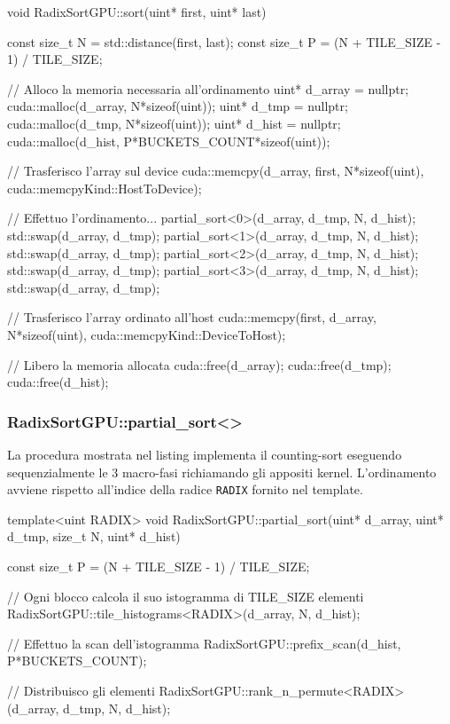 \begin{cpp}[caption={%
		Estratto del codice della procedura principale ordinamento.
	},%
	label={sort-code}, captionpos=t]
void RadixSortGPU::sort(uint* first, uint* last){
	const size_t N = std::distance(first, last);
	const size_t P = (N + TILE_SIZE - 1) / TILE_SIZE;
	
	// Alloco la memoria necessaria all'ordinamento
	uint* d_array = nullptr;
	cuda::malloc(d_array, N*sizeof(uint));
	uint* d_tmp = nullptr;
	cuda::malloc(d_tmp, N*sizeof(uint));
	uint* d_hist = nullptr;
	cuda::malloc(d_hist, P*BUCKETS_COUNT*sizeof(uint));
	
	// Trasferisco l'array sul device
	cuda::memcpy(d_array, first, N*sizeof(uint), 
	             cuda::memcpyKind::HostToDevice);
	
	// Effettuo l'ordinamento...
	partial_sort<0>(d_array, d_tmp, N, d_hist); 
	std::swap(d_array, d_tmp);
	partial_sort<1>(d_array, d_tmp, N, d_hist); 
	std::swap(d_array, d_tmp);
	partial_sort<2>(d_array, d_tmp, N, d_hist); 
	std::swap(d_array, d_tmp);
	partial_sort<3>(d_array, d_tmp, N, d_hist); 
	std::swap(d_array, d_tmp);

	// Trasferisco l'array ordinato all'host
	cuda::memcpy(first, d_array, N*sizeof(uint), 
	             cuda::memcpyKind::DeviceToHost);
	
	// Libero la memoria allocata
	cuda::free(d_array);
	cuda::free(d_tmp);
	cuda::free(d_hist);
}
\end{cpp}

\subsubsection{RadixSortGPU::partial\_sort<>}
La procedura  mostrata nel listing  implementa il counting-sort eseguendo sequenzialmente le 3 macro-fasi richiamando gli appositi kernel. L'ordinamento avviene rispetto all'indice della radice \texttt{RADIX} fornito nel template.

\begin{cpp}[caption={%
		Estratto del codice della procedura partial di ordinamento.
	},%
	label={partial-code}, captionpos=t]
template<uint RADIX>
void RadixSortGPU::partial_sort(uint* d_array, uint* d_tmp, 
                                size_t N, uint* d_hist){
	const size_t P = (N + TILE_SIZE - 1) / TILE_SIZE; 
	
	// Ogni blocco calcola il suo istogramma di TILE_SIZE elementi
	RadixSortGPU::tile_histograms<RADIX>(d_array, N, d_hist);
	
	// Effettuo la scan dell'istogramma
	RadixSortGPU::prefix_scan(d_hist, P*BUCKETS_COUNT);
	
	// Distribuisco gli elementi 
	RadixSortGPU::rank_n_permute<RADIX>(d_array, d_tmp, N, d_hist);
}
\end{cpp}


